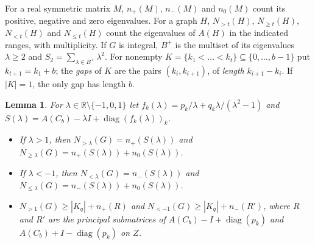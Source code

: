 \documentclass[11pt]{article}
\newtheorem{lemma}{Lemma}[section]
\theoremstyle{definition}
\theoremstyle{remark}
\DeclareMathOperator{\diag}{diag}
\newcommand{\R}{\mathbb R}
\begin{document}
For a real symmetric matrix $M$, $n_+(M)$, $n_-(M)$ and $n_0(M)$ count its
positive, negative and zero eigenvalues. For a graph $H$, $N_{>t}(H)$,
$N_{\ge t}(H)$, $N_{<t}(H)$ and $N_{\le t}(H)$ count the eigenvalues of $A(H)$
in the indicated ranges, with multiplicity. If $G$ is integral, $B^+$ is the
multiset of its eigenvalues $\lambda\ge2$ and $S_2=\sum_{\lambda\in
B^+}\lambda^2$. For nonempty $K=\{k_1<\dots<k_t\}\subseteq\{0,\dots,b-1\}$ put
$k_{t+1}=k_1+b$; the \emph{gaps} of $K$ are the pairs $(k_i,k_{i+1})$, of
\emph{length} $k_{i+1}-k_i$. If $|K|=1$, the only gap has length $b$.

\begin{lemma}\label{lem:schur}
For $\lambda\in\R\setminus\{-1,0,1\}$ let
$f_k(\lambda)=p_k/\lambda+q_k\lambda/(\lambda^2-1)$ and
$S(\lambda)=A(C_b)-\lambda I+\diag(f_k(\lambda))_k$.
\begin{itemize}
\item[(a)] If $\lambda>1$, then $N_{>\lambda}(G)=n_+(S(\lambda))$ and
 $N_{\ge\lambda}(G)=n_+(S(\lambda))+n_0(S(\lambda))$.
\item[(b)] If $\lambda<-1$, then $N_{<\lambda}(G)=n_-(S(\lambda))$ and
 $N_{\le\lambda}(G)=n_-(S(\lambda))+n_0(S(\lambda))$.
\item[(c)] $N_{>1}(G)\ge|K_q|+n_+(R)$ and $N_{<-1}(G)\ge|K_q|+n_-(R')$, where
 $R$ and $R'$ are the principal submatrices of $A(C_b)-I+\diag(p_k)$ and
 $A(C_b)+I-\diag(p_k)$ on $Z$.
\end{itemize}
\end{lemma}
\end{document}
